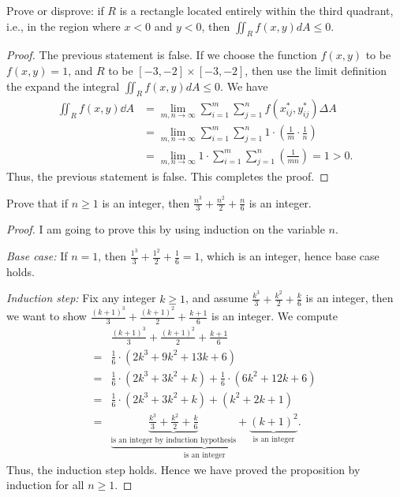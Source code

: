 \documentclass[10pt,twocolumn]{article}
\begin{document}
\begin{exercise}{2}
  Prove or disprove: if $R$ is a rectangle located entirely within the third quadrant, i.e.,
  in the region where $x < 0$ and $y < 0$, then $\iint_R f(x, y) dA \le 0$.
\end{exercise}

\begin{proof}
  The previous statement is false. If we choose the function $f(x,y)$ to be
  $f(x,y) = 1$, and $R$ to be $[-3,-2]\times [-3,-2]$, then use the limit
  definition the expand the integral $\iint_R f(x, y) dA \le 0$. We have
  \begin{align*}
    \iint_{R}f(x,y)\dd{A} &= \lim_{m,n\to \infty} \sum_{i=1}^m \sum_{j=1}^n
                            f(x_{ij}^*, y_{ij}^*) \Delta A \\
    &=\lim_{m,n\to \infty} \sum_{i=1}^m \sum_{j=1}^n
                            1 \cdot (\frac{1}{m}\cdot \frac{1}{n}) \\
    &=\lim_{m,n\to \infty} 1\cdot\sum_{i=1}^m \sum_{j=1}^n
                            (\frac{1}{mn}) = 1 > 0.
  \end{align*}
  Thus, the previous statement is false. This completes the proof.
\end{proof}

\begin{exercise}{3}
  Prove that if $n\ge 1$ is an integer, then $\frac{n^3}{3} + \frac{n^2}{2} +
  \frac{n}{6}$ is an integer.
\end{exercise}

\begin{proof}
  I am going to prove this by using induction on the variable $n$.

  \emph{Base case:} If $n=1$, then $\frac{1^3}{3} + \frac{1^2}{2} + \frac{1}{6}
  = 1$, which is an integer, hence base case holds.

  \emph{Induction step:} Fix any integer $k\ge 1$, and assume $\frac{k^3}{3} +
  \frac{k^2}{2} + \frac{k}{6}$ is an integer, then we want to show
  $\frac{(k+1)^3}{3} + \frac{(k+1)^2}{2} + \frac{k+1}{6}$ is an integer. We
  compute
  \begin{align*}
    &\frac{(k+1)^3}{3} + \frac{(k+1)^2}{2} + \frac{k+1}{6} \\
    =&\frac{1}{6}\cdot(2k^3+9k^2+13k+6) \\
    =&\frac{1}{6}\cdot(2k^3+3k^2+k) + \frac{1}{6}\cdot(6k^2+12k+6) \\
    =&\frac{1}{6}\cdot(2k^3+3k^2+k) + (k^2+2k+1) \\
    =&\underbrace{\underbrace{\frac{k^3}{3} + \frac{k^2}{2} + \frac{k}{6}}_\text{is an
    integer by induction hypothesis} + \underbrace{(k+1)^2}_\text{is an
    integer}}_\text{is an integer}.
  \end{align*}
  Thus, the induction step holds. Hence we have proved the proposition by
  induction for all $n\ge 1$.
\end{proof}
\end{document}
